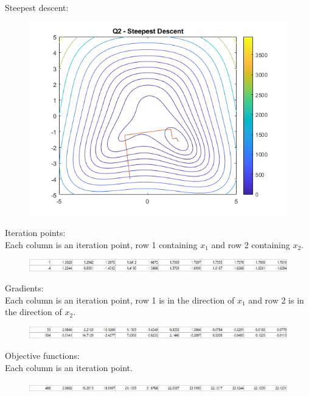 \documentclass[10pt,a4paper]{article}
\begin{document}
\newpage
Steepest descent:
\begin{figure} [H]
	\centering
	\includegraphics[width=0.7\linewidth]{q2sd}
\end{figure}
Iteration points: \\
Each column is an iteration point, row 1 containing \(x_1\) and row 2 containing \(x_2\).
\begin{figure} [H]
	\centering
	\includegraphics[width=1\linewidth]{q2sdp}
\end{figure}
Gradients: \\
Each column is an iteration point, row 1 is in the direction of \(x_1\) and row 2 is in the direction of \(x_2\).
\begin{figure} [H]
	\centering
	\includegraphics[width=1\linewidth]{q2sdg}
\end{figure}
Objective functions: \\
Each column is an iteration point.
\begin{figure} [H]
	\centering
	\includegraphics[width=1\linewidth]{q2sdf}
\end{figure}
\end{document}
